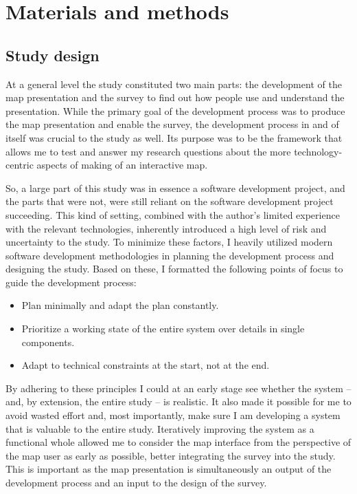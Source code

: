 \section{Materials and methods}

\subsection{Study design}

At a general level the study constituted two main parts:
the development of the map presentation and
the survey to find out how
people use and understand the presentation.
While the primary goal of the development process was
to produce the map presentation and enable the survey,
the development process in and of itself was crucial to the study as well.
Its purpose was to be the framework that
allows me to test and answer my research questions
about the more technology-centric aspects of
making of an interactive map.

So, a large part of this study was
in essence a software development project,
and the parts that were not, were still reliant on
the software development project succeeding.
This kind of setting,
combined with the author's limited experience with the relevant technologies,
inherently introduced a high level of risk and uncertainty to the study.
To minimize these factors,
I heavily utilized modern software development methodologies
\parencite{saq2020, bec2001, sha2017} in planning the development process
and designing the study.
Based on these,
I formatted the following points of focus
to guide the development process:
\begin{itemize}
	\item Plan minimally and adapt the plan constantly.
	\item Prioritize a working state of the entire system over details in single components.
	\item Adapt to technical constraints at the start, not at the end.
\end{itemize}

By adhering to these principles I could at an early stage see whether the system --
and, by extension, the entire study -- is realistic.
It also made it possible for me to avoid wasted effort and, most importantly,
make sure I am developing a system that is valuable to the entire study.
Iteratively improving the system as a functional whole
allowed me to consider the map interface
from the perspective of the map user as early as possible,
better integrating the survey into the study.
This is important as the map presentation is simultaneously an output of the development process
and an input to the design of the survey.

